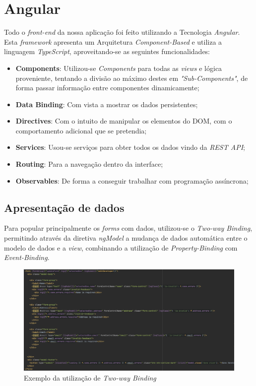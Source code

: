 \documentclass[10pt,english]{article}
\begin{document}
\clearpage
\section{Angular}
\par Todo o \textit{front-end} da nossa aplicação foi feito utilizando a Tecnologia \textit{Angular}. Esta \textit{framework} apresenta um Arquitetura \textit{Component-Based} e utiliza a linguagem \textit{TypeScript}, aproveitando-se as seguintes funcionalidades:
\begin{itemize}
  \item \textbf{Components}: Utilizou-se \textit{Components} para todas as \textit{views} e lógica proveniente, tentando a divisão ao máximo destes em \textit{"Sub-Components"}, de forma passar informação entre componentes dinamicamente;
  \item \textbf{Data Binding}: Com vista a mostrar os dados persistentes; 
  \item \textbf{Directives}: Com o intuito de manipular os elementos do DOM, com o comportamento adicional que se pretendia;
  \item \textbf{Services}: Usou-se serviços para obter todos os dados vindo da\textit{ REST API};
  \item \textbf{Routing}: Para a navegação dentro da interface;
  \item \textbf{Observables}: De forma a conseguir trabalhar com programação assíncrona;


\end{itemize}
    
\subsection{Apresentação de dados}

\par Para popular principalmente os \textit{forms} com dados, utilizou-se o \textit{Two-way Binding}, permitindo através da diretiva \textit{ngModel} a mudança de dados automática entre o modelo de dados e a \textit{view}, combinando a utilização de \textit{Property-Binding} com \textit{Event-Binding}.


\begin{figure}[!h]
        \centering
        \includegraphics[width=\textwidth]{images/edit_dev.png}
        \caption{Exemplo da utilização de \textit{Two-way Binding}}
\end{figure}
\end{document}
